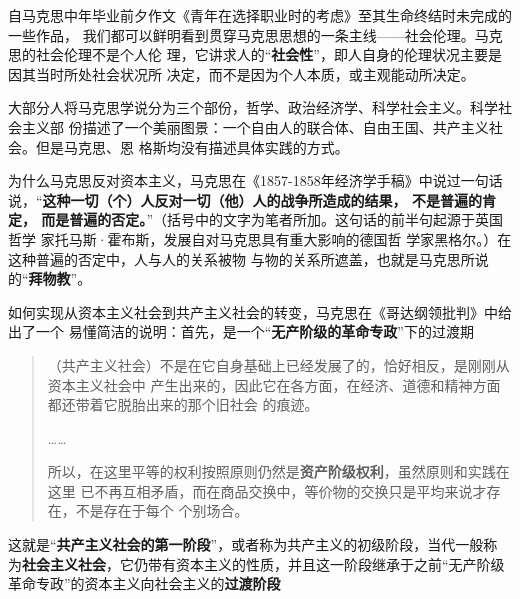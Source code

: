 自马克思中年毕业前夕作文《青年在选择职业时的考虑》至其生命终结时未完成的一些作品，
我们都可以鲜明看到贯穿马克思思想的一条主线——社会伦理。马克思的社会伦理不是个人伦
理，它讲求人的“\textbf{社会性}”，即人自身的伦理状况主要是因其当时所处社会状况所
决定，而不是因为个人本质，或主观能动所决定。

大部分人将马克思学说分为三个部份，哲学、政治经济学、科学社会主义。科学社会主义部
份描述了一个美丽图景：一个自由人的联合体、自由王国、共产主义社会。但是马克思、恩
格斯均没有描述具体实践的方式。

为什么马克思反对资本主义，马克思在《1857-1858年经济学手稿》中说过一句话
说，“\textbf{这种一切（个）人反对一切（他）人的战争所造成的结果， 不是普遍的肯
  定， 而是普遍的否定。}”（括号中的文字为笔者所加。这句话的前半句起源于英国哲学
家托马斯·霍布斯，发展自对马克思具有重大影响的德国哲
学家黑格尔。）在这种普遍的否定中，人与人的关系被物
与物的关系所遮盖，也就是马克思所说的``\textbf{拜物教}''。

如何实现从资本主义社会到共产主义社会的转变，马克思在《哥达纲领批判》中给出了一个
易懂简洁的说明：首先，是一个“\textbf{无产阶级的革命专政}”下的过渡期
\begin{quotation}
  （共产主义社会）不是在它自身基础上已经发展了的，恰好相反，是刚刚从资本主义社会中
  产生出来的，因此它在各方面，在经济、道德和精神方面都还带着它脱胎出来的那个旧社会
  的痕迹。

  ……
  
  所以，在这里平等的权利按照原则仍然是\textbf{资产阶级权利}，虽然原则和实践在这里
  已不再互相矛盾，而在商品交换中，等价物的交换只是平均来说才存在，不是存在于每个
  个别场合。
\end{quotation}
这就是“\textbf{共产主义社会的第一阶段}”，或者称为共产主义的初级阶段，当代一般称
为\textbf{社会主义社会}，它仍带有资本主义的性质，并且这一阶段继承于之前“无产阶级
革命专政”的资本主义向社会主义的\textbf{过渡阶段}

